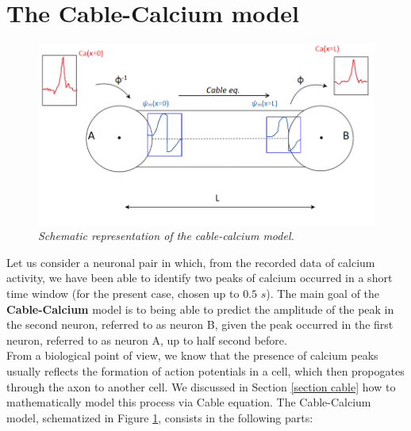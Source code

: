 \documentclass[12pt, a4paper]{report}
\begin{document}
\section{The Cable-Calcium model}

\begin{figure}[H]
	\begin{center}
		
		\includegraphics[scale=0.65]{cable_ca.png} 
	\end{center} 
	\caption{\textit{Schematic representation of the cable-calcium model.}}
	\label{cabel_ca}
\end{figure}

Let us consider a neuronal pair in which, from the recorded data of calcium activity, we have been able to identify two peaks of calcium occurred in a short time window (for the present case, chosen up to $0.5$ $s$). The main goal of the 
\textbf{Cable-Calcium} model is to being able to predict the amplitude of the peak in the second neuron, referred to as neuron B, given the peak occurred in the first neuron, referred to as neuron A, up to half second before.\\
From a biological point of view, we know that the presence of calcium peaks usually reflects the formation of action potentials in a cell, which then propogates through the axon to another cell. We discussed in Section \ref{section cable} how to mathematically model this process via Cable equation. The Cable-Calcium model, schematized in Figure \ref{cabel_ca}, consists in the following parts:
\end{document}
